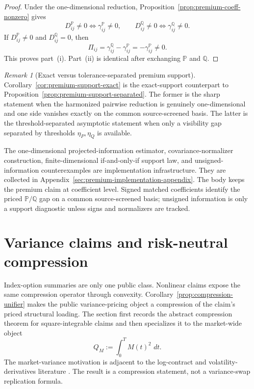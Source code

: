 \documentclass[11pt,a4paper]{amsart}
\theoremstyle{plain}
\theoremstyle{definition}
\theoremstyle{remark}
\newtheorem{remark}[theorem]{Remark}
\newcommand{\PP}{\mathbb{P}}
\newcommand{\QQ}{\mathbb{Q}}
\newcommand{\dd}{\,d}
\begin{document}
\begin{proof}
Under the one-dimensional reduction,
Proposition~\ref{prop:premium-coeff-nonzero} gives
\[
        D_{ij}^\PP\neq0\Longleftrightarrow \gamma_{ij}^\PP\neq0,
        \qquad
        D_{ij}^\QQ\neq0\Longleftrightarrow \gamma_{ij}^\QQ\neq0.
\]
If \(D_{ij}^\PP\neq0\) and \(D_{ij}^\QQ=0\), then
\[
        \Pi_{ij}
        =
        \gamma_{ij}^\QQ-\gamma_{ij}^\PP
        =
        -\gamma_{ij}^\PP
        \neq0.
\]
This proves part~(i).  Part~(ii) is identical after exchanging \(\PP\) and \(\QQ\).
\end{proof}

\begin{remark}[Exact versus tolerance-separated premium support]\label{rem:premium-support-exact}
Corollary~\ref{cor:premium-support-exact} is the exact-support counterpart to
Proposition~\ref{prop:premium-support-separated}.  The former is the sharp statement when the
harmonized pairwise reduction is genuinely one-dimensional and one side vanishes exactly on the
common source-screened basis.  The latter is the threshold-separated asymptotic statement when only a visibility
gap separated by thresholds \(\eta_P,\eta_Q\) is available.
\end{remark}


The one-dimensional projected-information estimator, covariance-normalizer construction,
finite-dimensional if-and-only-if support law, and unsigned-information counterexamples are
implementation infrastructure.  They are collected in Appendix~\ref{sec:premium-implementation-appendix}.
The body keeps the premium claim at coefficient level.  Signed matched coefficients identify the
priced \(\PP/\QQ\) gap on a common source-screened basis; unsigned information is only a support
diagnostic unless signs and normalizers are tracked.

\section{Variance claims and risk-neutral compression}\label{sec:variance}

Index-option summaries are only one public class.  Nonlinear claims expose the same compression
operator through convexity.  Corollary~\ref{prop:compression-unifier} makes the public
variance-pricing object a compression of the claim's priced structural loading.  The section first
records the abstract compression theorem for square-integrable claims and then specializes it to the
market-wide object
\[
        Q_M:=\int_0^T M(t)^2\,\dd t.
\]
The market-variance motivation is adjacent to the log-contract and volatility-derivatives literature
\cite{neuberger1994,carrlee2009}.  The result is a compression statement, not a variance-swap
replication formula.
\end{document}
